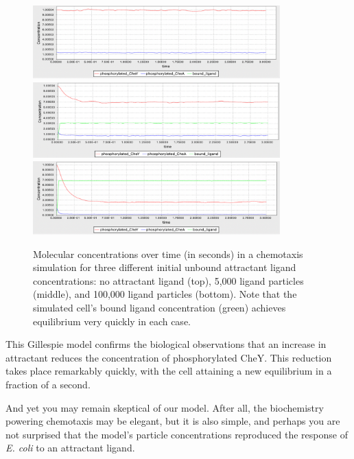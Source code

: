 \begin{figure}[hp]
\centering
\mySfFamily
\includegraphics[width = 0.85\textwidth]{../images/chemotaxis_tutorial5.png}\\[3ex]
\includegraphics[width = 0.85\textwidth]{../images/chemotaxis_tutorial6.png}\\[3ex]
\includegraphics[width = 0.85\textwidth]{../images/chemotaxis_tutorial7.png}
\caption{Molecular concentrations over time (in seconds) in a chemotaxis simulation for three different initial unbound attractant ligand concentrations: no attractant ligand (top), 5,000 ligand particles (middle), and 100,000 ligand particles (bottom). Note that the simulated cell's bound ligand concentration (green) achieves equilibrium very quickly in each case.}
\label{fig:chemotaxis_concentrations}
\end{figure}

This Gillespie model confirms the biological observations that an increase in attractant reduces the concentration of phosphorylated CheY. This reduction takes place remarkably quickly, with the cell attaining a new equilibrium in a fraction of a second.

And yet you may remain skeptical of our model. After all, the biochemistry powering chemotaxis may be elegant, but it is also simple, and perhaps you are not surprised that the model's particle concentrations reproduced the response of \textit{E. coli} to an attractant ligand.

